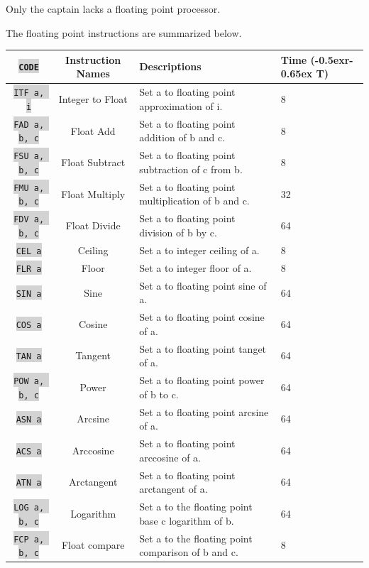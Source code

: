 \documentclass{article}
\newcommand{\vnscode}[1]{\colorbox{lightgray}{\lstinline[language=vns]{#1}}}
\newcommand{\RT}{\lower-0.5ex\hbox{r}\kern-0.65ex T}
\begin{document}
Only the captain lacks a floating point processor.

The floating point instructions are summarized below.

\begin{minipage}{\textwidth}
\label{table:float}
\centering
\begin{tabular}{|c|c|l|l|}
    \hline \vnscode{CODE} & Instruction Names & Descriptions & Time (\RT) \\ \hline
    \vnscode{ITF a, i} & Integer to Float & Set a to floating point approximation of i. & 8 \\ \hline
    \vnscode{FAD a, b, c} & Float Add & Set a to floating point addition of b and c. & 8 \\ \hline
    \vnscode{FSU a, b, c} & Float Subtract & Set a to floating point subtraction of c from b. & 8 \\ \hline
    \vnscode{FMU a, b, c} & Float Multiply & Set a to floating point multiplication of b and c. & 32 \\ \hline
    \vnscode{FDV a, b, c} & Float Divide & Set a to floating point division of b by c. & 64 \\ \hline
    \vnscode{CEL a} & Ceiling & Set a to integer ceiling of a. & 8 \\ \hline
    \vnscode{FLR a} & Floor & Set a to integer floor of a. & 8 \\ \hline
    \vnscode{SIN a} & Sine & Set a to floating point sine of a. & 64 \\ \hline
    \vnscode{COS a} & Cosine & Set a to floating point cosine of a. & 64 \\ \hline
    \vnscode{TAN a} & Tangent & Set a to floating point tanget of a. & 64 \\ \hline
    \vnscode{POW a, b, c} & Power & Set a to floating point power of b to c. & 64 \\ \hline
    \vnscode{ASN a} & Arcsine & Set a to floating point arcsine of a. & 64 \\ \hline
    \vnscode{ACS a} & Arccosine & Set a to floating point arccosine of a. & 64 \\ \hline
    \vnscode{ATN a} & Arctangent & Set a to floating point arctangent of a. & 64 \\ \hline
    \vnscode{LOG a, b, c} & Logarithm & Set a to the floating point base c logarithm of b. & 64 \\ \hline
    \vnscode{FCP a, b, c} & Float compare & Set a to the floating point comparison of b and c. & 8 \\ \hline
\end{tabular}
\end{minipage}
\end{document}
